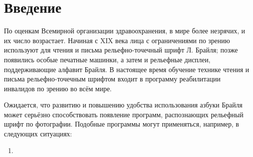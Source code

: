 \documentclass{main.tex}[subfiles]
\begin{document}
\section{Введение}
По оценкам Всемирной организации здравоохранения, в мире более %
незрячих, и их число возрастает. %
Начиная с XIX века лица с ограничениями по зрению используют для чтения и письма рельефно-точечный шрифт Л. Брайля; позже появились особые печатные машинки, а затем и рельефные дисплеи, поддерживающие алфавит Брайля.
В настоящее время обучение технике чтения и письма рельефно-точечным шрифтом входит в программу реабилитации инвалидов по зрению во всём мире.

Ожидается, что развитию и повышению удобства использования азбуки Брайля может серьёзно способствовать появление программ, распознающих рельефный шрифт по фотографии.
Подобные программы могут применяться, например, в следующих ситуациях:
\begin{enumerate}[noitemsep]
	\item %
\end{enumerate}
\end{document}
